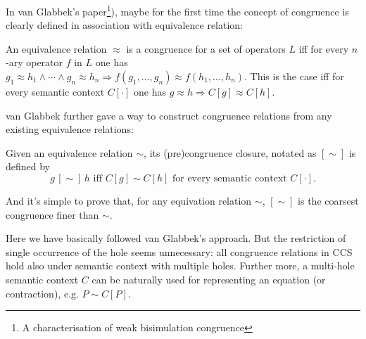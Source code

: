 In van Glabbek's paper\footnote{A characterisation of weak
  bisimulation congruence}), maybe for the first time the concept of
congruence is clearly defined in association with equivalence
relation:
\begin{definition}
An equivalence relation $\approx$ is a congruence for a set of
operators $L$ iff for every $n$-ary operator $f$ in $L$ one has
$g_1\approx h_1 \wedge \cdots \wedge g_n \approx h_n \Rightarrow
f(g_1,\ldots,g_n) \approx f(h_1,\ldots,h_n)$. This is the case iff for
every semantic context $C[\cdot]$ one has $g\approx h \Rightarrow
C[g]\approx C[h]$.
\end{definition}

van Glabbek further gave a way to construct congruence relations from
any existing equivalence relations:
\begin{definition}
\label{def:precc}
Given an equivalence relation $\sim$, its (pre)congruence closure,
notated as $[\sim]$ is defined by
\begin{equation}
g\,[\sim]\, h \mbox{ iff } C[g] \sim C[h] \mbox{ for every semantic
  context } C[\cdot].
\end{equation}
\end{definition}
And it's simple to prove that, for any equivation relation $\sim$,
$[\sim]$ is the coarsest congruence finer than $\sim$.

Here we have basically followed van Glabbek's approach. But the
restriction of single occurrence of the hole seems unnecessary: all
congruence relations in CCS hold also under semantic context with
multiple holes. Further more, a multi-hole semantic context $C$ can be
naturally used for representing an equation (or contraction), e.g. $P
\sim C[P]$.

